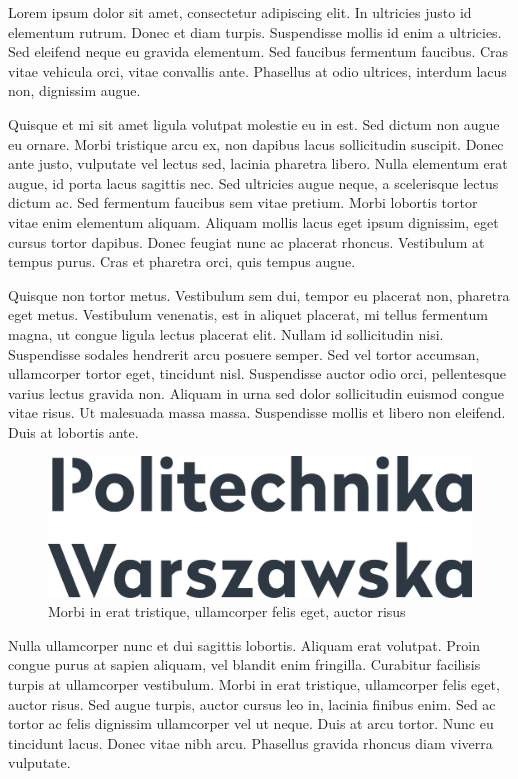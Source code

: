 Lorem ipsum dolor sit amet, consectetur adipiscing elit. In ultricies justo id elementum rutrum. Donec et diam turpis. Suspendisse mollis id enim a ultricies. Sed eleifend neque eu gravida elementum. Sed faucibus fermentum faucibus. Cras vitae vehicula orci, vitae convallis ante. Phasellus at odio ultrices, interdum lacus non, dignissim augue.

Quisque et mi sit amet ligula volutpat molestie eu in est. Sed dictum non augue eu ornare. Morbi tristique arcu ex, non dapibus lacus sollicitudin suscipit. Donec ante justo, vulputate vel lectus sed, lacinia pharetra libero. Nulla elementum erat augue, id porta lacus sagittis nec. Sed ultricies augue neque, a scelerisque lectus dictum ac. Sed fermentum faucibus sem vitae pretium. Morbi lobortis tortor vitae enim elementum aliquam. Aliquam mollis lacus eget ipsum dignissim, eget cursus tortor dapibus. Donec feugiat nunc ac placerat rhoncus. Vestibulum at tempus purus. Cras et pharetra orci, quis tempus augue.

Quisque non tortor metus. Vestibulum sem dui, tempor eu placerat non, pharetra eget metus. Vestibulum venenatis, est in aliquet placerat, mi tellus fermentum magna, ut congue ligula lectus placerat elit. Nullam id sollicitudin nisi. Suspendisse sodales hendrerit arcu posuere semper. Sed vel tortor accumsan, ullamcorper tortor eget, tincidunt nisl. Suspendisse auctor odio orci, pellentesque varius lectus gravida non. Aliquam in urna sed dolor sollicitudin euismod congue vitae risus. Ut malesuada massa massa. Suspendisse mollis et libero non eleifend. Duis at lobortis ante.

\begin{figure}[h]
    \centering
    \includegraphics[width=\columnwidth]{./figures/example.png}
    \caption{Morbi in erat tristique, ullamcorper felis eget, auctor risus}
    \label{fig:example-figure}
\end{figure}

Nulla ullamcorper nunc et dui sagittis lobortis. Aliquam erat volutpat. Proin congue purus at sapien aliquam, vel blandit enim fringilla. Curabitur facilisis turpis at ullamcorper vestibulum. Morbi in erat tristique, ullamcorper felis eget, auctor risus. Sed augue turpis, auctor cursus leo in, lacinia finibus enim. Sed ac tortor ac felis dignissim ullamcorper vel ut neque. Duis at arcu tortor. Nunc eu tincidunt lacus. Donec vitae nibh arcu. Phasellus gravida rhoncus diam viverra vulputate.

